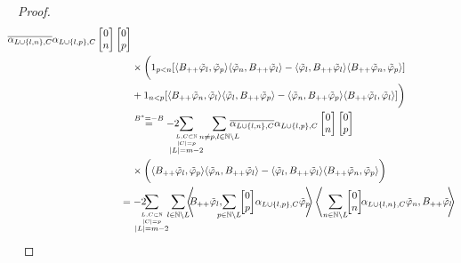 \documentclass[b5paper,draft,openbib,12pt]{memoir}
\begin{document}
\begin{proof}
\begin{align}
\hspace{-0.4cm}\overline{\alpha_{L\cup\{l,n\},C}}\alpha_{L\cup\{l,p\},C}
\left[\begin{matrix}0\\n\end{matrix}\right]\left[\begin{matrix}0\\p\end{matrix}\right]\\
&\times \bigg( 1_{p<n}[
\langle B_{++}\tilde{\varphi}_{l},\tilde{\varphi}_{p} \rangle \langle  \tilde{\varphi}_{n}, B_{++}\tilde{\varphi}_{l}\rangle
-\langle \tilde{\varphi}_{l},B_{++}\tilde{\varphi}_{l} \rangle \langle B_{++} \tilde{\varphi}_{n}, \tilde{\varphi}_{p}\rangle]\\
&+1_{n<p}[\langle B_{++}\tilde{\varphi}_{n},\tilde{\varphi}_{l} \rangle \langle  \tilde{\varphi}_{l}, B_{++}\tilde{\varphi}_{p}\rangle
-\langle \tilde{\varphi}_{n},B_{++}\tilde{\varphi}_{p} \rangle \langle B_{++} \tilde{\varphi}_{l}, \tilde{\varphi}_{l}\rangle]\bigg)\\
&\overset{B^*=-B}{=}-2\hspace{-0.4cm}\sum_{\overset{L,C\subset \mathbb{N}}{\overset{|C|=p}{|L|=m-2}}}\hspace{-0.2cm}\sum_{n\neq p, l\in\mathbb{N}\backslash L }
\hspace{-0.4cm}\overline{\alpha_{L\cup\{l,n\},C}}\alpha_{L\cup\{l,p\},C}
\left[\begin{matrix}0\\n\end{matrix}\right]\left[\begin{matrix}0\\p\end{matrix}\right]\\
&\times \bigg( 
\langle B_{++}\tilde{\varphi}_{l},\tilde{\varphi}_{p} \rangle \langle  \tilde{\varphi}_{n}, B_{++}\tilde{\varphi}_{l}\rangle
-\langle \tilde{\varphi}_{l},B_{++}\tilde{\varphi}_{l} \rangle \langle B_{++} \tilde{\varphi}_{n}, \tilde{\varphi}_{p}\rangle\bigg)\\
&\hspace{-0.4cm}=-2\hspace{-0.4cm}\!\sum_{\overset{L,C\subset \mathbb{N}}{\overset{|C|=p}{|L|=m-2}}}\!\!\sum_{l\in\mathbb{N}\backslash L}\!\!\!
\left\langle\!\!\! B_{++} \tilde{\varphi}_{l}, \!\!\!\!\sum_{p\in\mathbb{N}\backslash L}\!\!\left[\begin{matrix}0\\p\end{matrix}\right] \!\alpha_{L\cup\{l,p\},C}\tilde{\varphi}_p \!\!\!\right\rangle \left\langle \sum_{n\in\mathbb{N}\backslash L} \!\!\left[\begin{matrix}0\\n\end{matrix}\right]\!\!\alpha_{L\cup \{l,n\},C} \tilde{\varphi}_n,  B_{++} \tilde{\varphi}_l \!\!\!\right\rangle\\

\end{align}
\end{proof}
\end{document}
